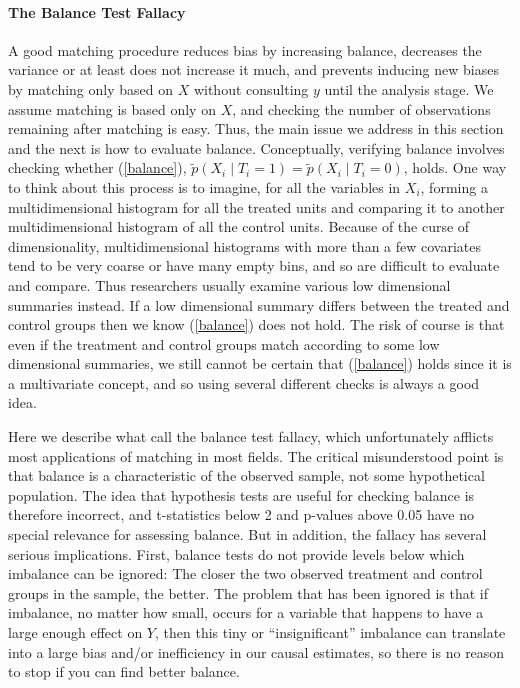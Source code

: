 \documentclass[11pt,titlepage]{article}
\begin{document}
\paragraph{The Balance Test Fallacy}

A good matching procedure reduces bias by increasing balance,
decreases the variance or at least does not increase it much, and
prevents inducing new biases by matching only based on $X$ without
consulting $y$ until the analysis stage.  We assume matching is based
only on $X$, and checking the number of observations remaining after
matching is easy.  Thus, the main issue we address in this section and
the next is how to evaluate balance.  Conceptually, verifying balance
involves checking whether (\ref{balance}), $\tilde p(X_i \mid
T_i=1)=\tilde p(X_i\mid T_i=0)$, holds.  One way to think about this
process is to imagine, for all the variables in $X_i$, forming a
multidimensional histogram for all the treated units and comparing it
to another multidimensional histogram of all the control units.
Because of the curse of dimensionality, multidimensional histograms
with more than a few covariates tend to be very coarse or have many
empty bins, and so are difficult to evaluate and compare.  Thus
researchers usually examine various low dimensional summaries instead.
If a low dimensional summary differs between the treated and control
groups then we know (\ref{balance}) does not hold.  The risk of course
is that even if the treatment and control groups match according to
some low dimensional summaries, we still cannot be certain that
(\ref{balance}) holds since it is a multivariate concept, and so using
several different checks is always a good idea.

Here we describe what \citet{ImaKinStu05} call the balance test
fallacy, which unfortunately afflicts most applications of matching in
most fields.  The critical misunderstood point is that balance is a
characteristic of the observed sample, not some hypothetical
population.  The idea that hypothesis tests are useful for checking
balance is therefore incorrect, and t-statistics below 2 and p-values
above 0.05 have no special relevance for assessing balance.  But in
addition, the fallacy has several serious implications.  First,
balance tests do not provide levels below which imbalance can be
ignored: The closer the two observed treatment and control groups in
the sample, the better.  The problem that has been ignored is that if
imbalance, no matter how small, occurs for a variable that happens to
have a large enough effect on $Y$, then this tiny or ``insignificant''
imbalance can translate into a large bias and/or inefficiency in our
causal estimates, so there is no reason to stop if you can find better
balance.  
\end{document}
